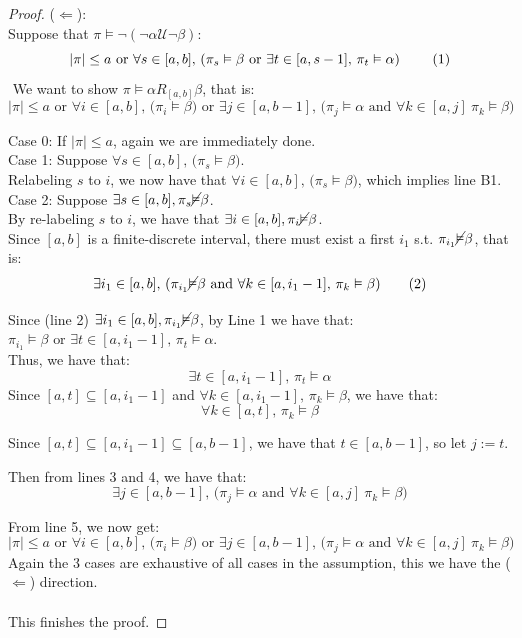 \documentclass[runningheads]{llncs}
\begin{document}
\begin{proof}
\noindent ($\Leftarrow$):\\
\indent Suppose that $\pi \vDash \neg (\neg \alpha \mathcal{U} \neg \beta)$:
\[
|\pi| \le a \text{ or } \forall s \in [a,b] \text{, (} \pi_s \vDash \beta \text{ or } \exists t \in [a, s-1] \text{, } \pi_t \vDash \alpha \text{) \tag{1}}
\]
$ $ \newline
\indent We want to show $\pi \vDash \alpha R_{[a,b]} \beta$, that is:
\[ |\pi| \leq a \text{ or } \forall i \in [a,b] \text{, (} \pi_i \vDash \beta \text{) or } \exists j \in [a,b-1] \text{, (} \pi_j \vDash \alpha \text{ and } \forall k \in [a, j] \ \pi_k \vDash \beta \text{)} \tag{B1} \]

\indent Case 0: If $|\pi| \leq a$, again we are immediately done. \\
\indent Case 1: Suppose $\forall s \in [a,b] \text{, (} \pi_s \vDash \beta \text{)}$.\\ 
\indent \indent Relabeling $s$ to $i$, we now have that $\forall i \in [a, b] \text{, (}\pi_s \vDash \beta \text{)}$, which implies line B1. \\

\indent Case 2: Suppose $\exists s \in [a,b], \pi_s \cancel{\vDash} \beta$.\\
\indent \indent By re-labeling $s$ to $i$, we have that $\exists i \in [a,b], \pi_i \cancel{\vDash} \beta$.\\
\indent \indent Since $[a,b]$ is a finite-discrete interval, there must exist a first $i_1$ s.t. $\pi_{i_1} \cancel{\vDash} \beta$, that is:
\[ 
\exists i_1 \in [a,b]\text{, (}  \pi_{i_1} \cancel{\vDash} \beta  \text{ and }  \forall k \in [a, i_1 - 1] \text{, } \pi_{k} \vDash \beta \text{)}
\tag{2}\]

\indent \indent Since (line 2) $\exists i_1 \in [a,b], \pi_{i_1} \cancel{\vDash} \beta$, by Line 1 we have that: $\pi_{i_1} \vDash \beta \text{ or } \exists t \in [a, i_1 - 1] \text{, } \pi_t \vDash \alpha$.\\
\indent \indent Thus, we have that: 
\[
\exists t \in [a, i_1 - 1] \text{, } \pi_t \vDash \alpha \tag{3}
\]
\indent \indent Since  $[a, t] \subseteq [a, i_1 - 1]$ and $\forall k \in [a, i_1 - 1] \text{, } \pi_{k} \vDash \beta$, we have that:
\[ 
\forall k \in [a, t]\text{, } \pi_{k} \vDash \beta \tag{4}
\]

\indent \indent Since $[a,t] \subseteq [a, i_1 - 1] \subseteq [a,b-1]$, we have that $t \in [a,b-1]$, so let $j := t$.

\indent \indent Then from lines 3 and 4, we have that:
\[
\exists j \in [a,b-1] \text{, (} \pi_j \vDash \alpha \text{ and } \forall k \in [a, j] \ \pi_k \vDash \beta \text{)} \tag{5}
\]

\indent \indent From line 5, we now get:
\[ 
|\pi| \leq a \text{ or } \forall i \in [a,b] \text{, (} \pi_i \vDash \beta \text{) or } \exists j \in [a,b-1] \text{, (} \pi_j \vDash \alpha \text{ and } \forall k \in [a, j] \ \pi_k \vDash \beta \text{)} \tag{B1}
\]
\indent Again the 3 cases are exhaustive of all cases in the assumption, this we have the ($\Leftarrow$) direction.\\
\\
This finishes the proof.
\end{proof}
\end{document}
